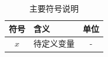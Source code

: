 \begin{table}[htbp]
  \centering
  \caption{主要符号说明}
  \begin{tabularx}{\textwidth}{cYc}
    \toprule
    符号 & 含义 & 单位 \\
    \midrule
    $x$ & 待定义变量 & - \\
    \bottomrule
  \end{tabularx}
\end{table}

